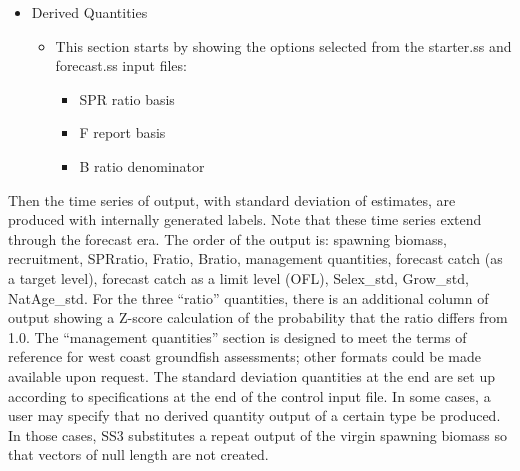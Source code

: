 \begin{itemize}
\begin{itemize}
		\end{itemize}
	\item Derived Quantities
		\begin{itemize}
			\item This section starts by showing the options selected from the starter.ss and forecast.ss input files:
				\begin{itemize}
					\item SPR ratio basis
					\item F report basis
					\item B ratio denominator
				\end{itemize}
		\end{itemize}
\end{itemize}

Then the time series of output, with standard deviation of estimates, are produced with internally generated labels. Note that these time series extend through the forecast era. The order of the output is: spawning biomass, recruitment, SPRratio, Fratio, Bratio, management quantities, forecast catch (as a target level), forecast catch as a limit level (OFL), Selex\_std, Grow\_std, NatAge\_std. For the three ``ratio'' quantities, there is an additional column of output showing a Z-score calculation of the probability that the ratio differs from 1.0. The ``management quantities'' section is designed to meet the terms of reference for west coast groundfish assessments; other formats could be made available upon request. The standard deviation quantities at the end are set up according to specifications at the end of the control input file. In some cases, a user may specify that no derived quantity output of a certain type be produced. In those cases, SS3 substitutes a repeat output of the virgin spawning biomass so that vectors of null length are not created.

